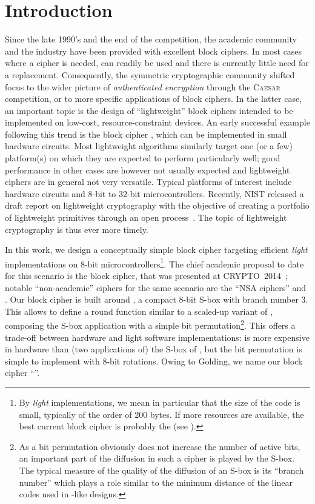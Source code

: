 \section{Introduction}
Since the late 1990's and the end of the \aes competition, the academic community and the industry have been provided with excellent block ciphers.
In most cases where a cipher is needed, \aes \cite{rijndael} can readily be used and there is currently little need for a replacement.
Consequently, the symmetric cryptographic community shifted focus to \eg the wider picture of \emph{authenticated encryption} through
the \textsc{Caesar} competition, or to more specific applications of block ciphers. In the latter case, an important topic is
the design of ``lightweight'' block ciphers intended to be implemented on low-cost, resource-constraint devices. An early
successful example following this trend is the block cipher \present \cite{present}, which can be implemented in small hardware circuits.
Most lightweight algorithms similarly target one (or a few) platform(s) on which they are expected to perform particularly well;
good performance in other cases are however not usually expected and lightweight ciphers are in general not very versatile.
Typical platforms of interest include hardware circuits and 8-bit to 32-bit microcontrollers.
Recently, NIST released a draft report on lightweight cryptography with the objective of creating a portfolio of lightweight primitives
through an open process~\cite{NistLightDraft}. The topic of lightweight cryptography is thus ever more timely. 

In this work, we design a conceptually simple block cipher targeting efficient \emph{light} implementations on 8-bit microcontrollers\footnote{By \emph{light} implementations,
we mean in particular that the size of the code is small, typically of the order of 200 bytes. If more resources are available, the best current block cipher is
probably the \aes (see \eg \cite{DBLP:journals/iacr/BeaulieuSSTWW15}).}.
The chief academic proposal to date for this scenario is the \pride block cipher,
that was presented at CRYPTO~2014~\cite{pride};
notable
``non-academic'' ciphers for the same scenario are the ``NSA ciphers'' \simon and \speck \cite{NSAciph}.
Our block cipher is built around \littlunOne, a compact 8-bit S-box with branch number 3. This allows
to define a round function similar to a scaled-up variant of \present, composing the S-box application with a simple bit permutation\footnote{As a bit permutation
obviously does not increase the number of active bits, an important part of the diffusion in such a cipher is played by the S-box. The typical measure of the quality
of the diffusion of an S-box is its ``branch number'' which plays a role similar to the minimum distance of the linear codes used in \aes-like designs.}.
This offers a trade-off between hardware and light software implementations: \littlunOne is more expensive in hardware than (two applications
of) the S-box of \present, but the bit permutation is simple to implement with 8-bit rotations. Owing to Golding, we name our
block cipher ``\fly''.

